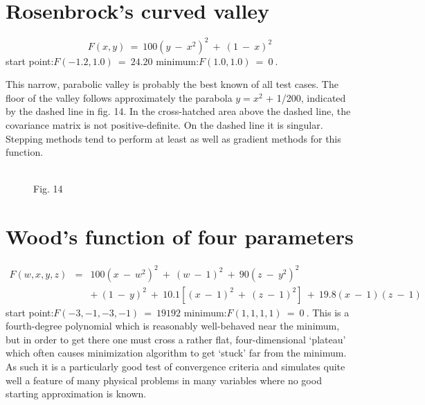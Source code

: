  
\section{Rosenbrock's curved valley}
 
                 $$ F(x,y)~=~100(y~-~x^2)^2~+~(1~-~x)^2$$
\noindent 
start point:{\phantom{xxxxxxxxxxxxxxxxxx}}$ F(-1.2,1.0)~=~24.20$
\vskip2mm
\noindent
minimum:{\phantom{xxxxxxxxxxxxxxxxxxx}}$ F(1.0,1.0)~=~0~.$
\vskip2mm
 
     This narrow, parabolic valley is probably the best known of all test
cases.  The floor of the valley follows approximately the parabola
$y = x^2$ + 1/200, indicated by the dashed line in fig. 14.  In the
cross-hatched area above the dashed line, the covariance matrix is not
positive-definite.  On the dashed line it is singular.  Stepping methods
tend to perform at least as well as gradient methods for this function.\\ 
\begin{figure}[t]
\begin{center}\mbox{}\\
Fig. 14
\end{center}
\end{figure}
 
 
\section{Wood's function of four parameters}
 
 
\begin{eqnarray}
  F(w,x,y,z)& =& 100(x~-~w^{2})^{2}~+~(w~-~1)^{2}~+~90(z~-~y^{2})^{2}\nonumber\\
              && +~(1~-~y)^{2}~+~10.1[(x~-~1)^{2}~+~(z~-~1)^{2}]~+~19.8(x~-~1)(z~-~1)\nonumber 
\end{eqnarray}
\noindent 
start point:{\phantom{xxxxxxxxxxxxxxxxxx}}$F(-3,-1,-3,-1)~=~19192$
\vskip2mm
\noindent
minimum:{\phantom{xxxxxxxxxxxxxxxxxxx}}$F(1,1,1,1)~=~0~.$
\vskip2mm 
     This is a fourth-degree polynomial which is reasonably well-behaved
near the minimum, but in order to get there one must cross a rather flat,
four-dimensional `plateau' which often causes minimization algorithm to
get `stuck' far from the minimum.  As such it is a particularly good
test of convergence criteria and simulates quite well a feature of many
physical problems in many variables where no good starting
approximation is known.\\ 
 
